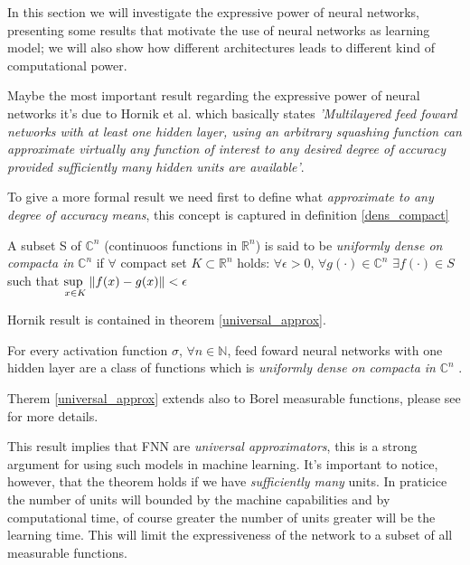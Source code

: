 In this section we will investigate the expressive power of neural networks, presenting some results that motivate the use of neural networks as learning
model; we will also show how different architectures leads to different kind of computational power.
 

Maybe the most important result regarding the expressive power of neural networks it's due to Hornik et al. \cite{Hornik89} which basically states
\textit{'Multilayered feed foward networks with at least one hidden layer, using an arbitrary squashing function can approximate virtually any function
of interest to any desired degree of accuracy provided sufficiently many hidden units are available'}.

To give a more formal result we need first to define what \textit{approximate to any degree of accuracy means}, this concept is captured in definition
\ref{dens_compact}
 
\begin{defn}
 A subset S of $\mathbb{C}^n$ (continuoos functions in $\mathbb{R}^n$) is said to be \textit{uniformly dense on compacta in} $\mathbb{C}^n$ if $\forall$
 compact set $K\subset \mathbb{R}^n$ holds: $\forall \epsilon >0$, $\forall g(\cdot) \in \mathbb{C}^n$ $\exists f(\cdot) \in S$ such that 
 $\underset{x \in K}{\text{sup  }} \left\Vert f(x)-g(x) \right\Vert<\epsilon$ 
 \label{dens_compact}
\end{defn}

Hornik result is contained in theorem \ref{universal_approx}.
\begin{thm}
 For every activation function $\sigma$, $\forall n\in \mathbb{N}$, feed foward neural
 networks with one hidden layer are a class of functions which is \textit{uniformly dense on compacta in} $\mathbb{C}^n$
\label{universal_approx}.
\end{thm}
Therem \ref{universal_approx} extends also to Borel measurable functions, please see \cite{Hornik89} for more details.


This result implies that FNN are \textit{universal approximators}, this is a strong argument for using such models in machine learning.
It's important to notice, however, that the theorem holds if we have \textit{sufficiently many} units. In praticice the number of units will bounded
by the machine capabilities and by computational time, of course greater the number of units greater will be the learning time. This will limit
the expressiveness of the network to a subset of all measurable functions.

